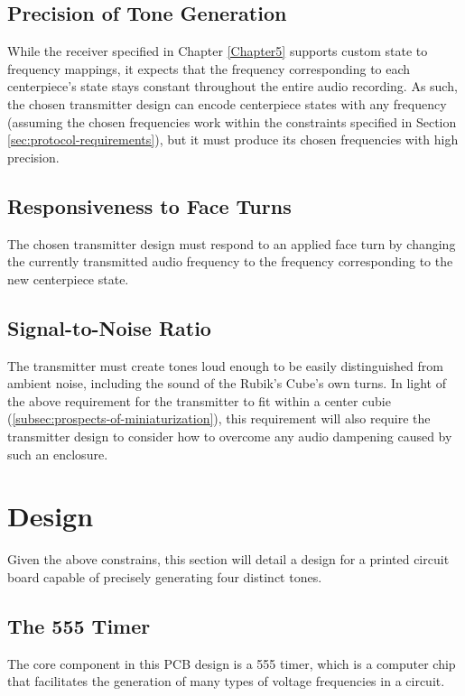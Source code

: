 \subsection{Precision of Tone Generation}
\label{subsec:precision-of-tone-generation}
While the receiver specified in Chapter \ref{Chapter5} supports custom state to frequency mappings, it expects that the frequency corresponding to each centerpiece's state stays constant throughout the entire audio recording.
As such, the chosen transmitter design can encode centerpiece states with any frequency (assuming the chosen frequencies work within the constraints specified in Section \ref{sec:protocol-requirements}), but it must produce its chosen frequencies with high precision.

\subsection{Responsiveness to Face Turns}
\label{subsec:responsiveness-to-face-turns}
The chosen transmitter design must respond to an applied face turn by changing the currently transmitted audio frequency to the frequency corresponding to the new centerpiece state.

\subsection{Signal-to-Noise Ratio}
\label{subsec:transmitter-signal-to-noise-ratio}
The transmitter must create tones loud enough to be easily distinguished from ambient noise, including the sound of the Rubik's Cube's own turns.
In light of the above requirement for the transmitter to fit within a center cubie (\ref{subsec:prospects-of-miniaturization}), this requirement will also require the transmitter design to consider how to overcome any audio dampening caused by such an enclosure.


\newpage
\section{Design}
\label{sec:transmitter-design}
Given the above constrains, this section will detail a design for a printed circuit board capable of precisely generating four distinct tones.

\subsection{The 555 Timer}
\label{sec:the-555-timer}
The core component in this PCB design is a 555 timer, which is a computer chip that facilitates the generation of many types of voltage frequencies in a circuit.

